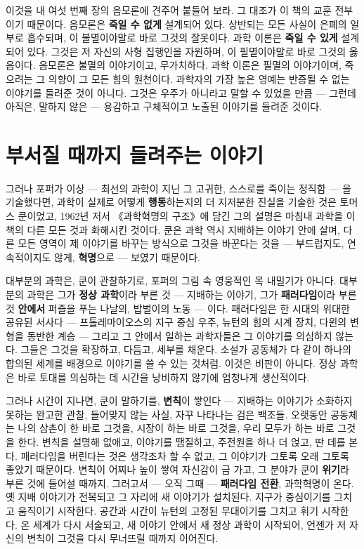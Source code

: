 이것을 내 여섯 번째 장의 음모론에 견주어 붙들어 보라. 그 대조가 이 책의 교훈 전부이기 때문이다. 음모론은 \textbf{죽일 수 없게} 설계되어 있다. 상반되는 모든 사실이 은폐의 일부로 흡수되며, 이 불멸이야말로 바로 그것의 잘못이다. 과학 이론은 \textbf{죽일 수 있게} 설계되어 있다. 그것은 저 자신의 사형 집행인을 자원하며, 이 필멸이야말로 바로 그것의 옳음이다. 음모론은 불멸의 이야기이고, 무가치하다. 과학 이론은 필멸의 이야기이며, 죽으려는 그 의향이 그 모든 힘의 원천이다. 과학자의 가장 높은 영예는 반증될 수 없는 이야기를 들려준 것이 아니다. 그것은 우주가 아니라고 말할 수 있었을 만큼 — 그런데 아직은, 말하지 않은 — 용감하고 구체적이고 노출된 이야기를 들려준 것이다.

\section*{부서질 때까지 들려주는 이야기}

그러나 포퍼가 이상 — 최선의 과학이 지닌 그 고귀한, 스스로를 죽이는 정직함 — 을 기술했다면, 과학이 실제로 어떻게 \textbf{행동}하는지의 더 지저분한 진실을 기술한 것은 토머스 쿤이었고, 1962년 저서 《과학혁명의 구조》에 담긴 그의 설명은 마침내 과학을 이 책의 다른 모든 것과 화해시킨 것이다. 쿤은 과학 역시 지배하는 이야기 안에 살며, 다른 모든 영역이 제 이야기를 바꾸는 방식으로 그것을 바꾼다는 것을 — 부드럽지도, 연속적이지도 않게, \textbf{혁명}으로 — 보였기 때문이다.

대부분의 과학은, 쿤이 관찰하기로, 포퍼의 그림 속 영웅적인 목 내밀기가 아니다. 대부분의 과학은 그가 \textbf{정상 과학}이라 부른 것 — 지배하는 이야기, 그가 \textbf{패러다임}이라 부른 것 \textbf{안에서} 퍼즐을 푸는 나날의, 밥벌이의 노동 — 이다. 패러다임은 한 시대의 위대한 공유된 서사다 — 프톨레마이오스의 지구 중심 우주, 뉴턴의 힘의 시계 장치, 다윈의 변형을 동반한 계승 — 그리고 그 안에서 일하는 과학자들은 그 이야기를 의심하지 않는다. 그들은 그것을 확장하고, 다듬고, 세부를 채운다. 소설가 공동체가 다 같이 하나의 합의된 세계를 배경으로 이야기를 쓸 수 있는 것처럼. 이것은 비판이 아니다. 정상 과학은 바로 토대를 의심하는 데 시간을 낭비하지 않기에 엄청나게 생산적이다.

그러나 시간이 지나면, 쿤이 말하기를, \textbf{변칙}이 쌓인다 — 지배하는 이야기가 소화하지 못하는 완고한 관찰, 들어맞지 않는 사실, 자꾸 나타나는 검은 백조들. 오랫동안 공동체는 나의 삼촌이 한 바로 그것을, 시장이 하는 바로 그것을, 우리 모두가 하는 바로 그것을 한다. 변칙을 설명해 없애고, 이야기를 땜질하고, 주전원을 하나 더 얹고, 딴 데를 본다. 패러다임을 버린다는 것은 생각조차 할 수 없고, 그 이야기가 그토록 오래 그토록 좋았기 때문이다. 변칙이 어찌나 높이 쌓여 자신감이 금 가고, 그 분야가 쿤이 \textbf{위기}라 부른 것에 들어설 때까지. 그러고서 — 오직 그때 — \textbf{패러다임 전환}, 과학혁명이 온다. 옛 지배 이야기가 전복되고 그 자리에 새 이야기가 설치된다. 지구가 중심이기를 그치고 움직이기 시작한다. 공간과 시간이 뉴턴의 고정된 무대이기를 그치고 휘기 시작한다. 온 세계가 다시 서술되고, 새 이야기 안에서 새 정상 과학이 시작되어, 언젠가 저 자신의 변칙이 그것을 다시 무너뜨릴 때까지 이어진다.

